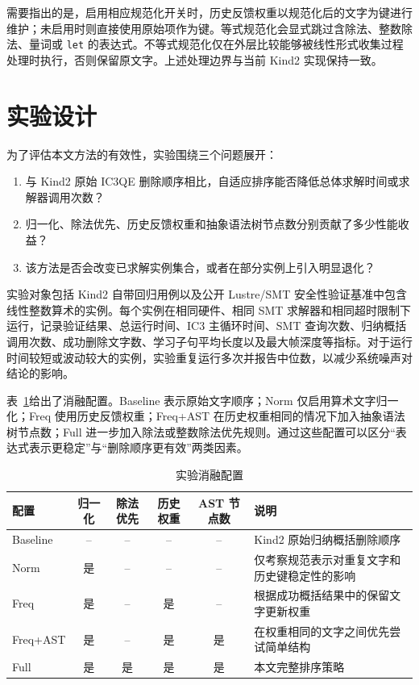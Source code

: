 \documentclass[11pt,a4paper]{article}
\begin{document}
需要指出的是，启用相应规范化开关时，历史反馈权重以规范化后的文字为键进行维护；未启用时则直接使用原始项作为键。等式规范化会显式跳过含除法、整数除法、量词或 \texttt{let} 的表达式。不等式规范化仅在外层比较能够被线性形式收集过程处理时执行，否则保留原文字。上述处理边界与当前 Kind2 实现保持一致。

\section{实验设计}

为了评估本文方法的有效性，实验围绕三个问题展开：
\begin{enumerate}
  \item 与 Kind2 原始 IC3QE 删除顺序相比，自适应排序能否降低总体求解时间或求解器调用次数？
  \item 归一化、除法优先、历史反馈权重和抽象语法树节点数分别贡献了多少性能收益？
  \item 该方法是否会改变已求解实例集合，或者在部分实例上引入明显退化？
\end{enumerate}

实验对象包括 Kind2 自带回归用例以及公开 Lustre/SMT 安全性验证基准中包含线性整数算术的实例。每个实例在相同硬件、相同 SMT 求解器和相同超时限制下运行，记录验证结果、总运行时间、IC3 主循环时间、SMT 查询次数、归纳概括调用次数、成功删除文字数、学习子句平均长度以及最大帧深度等指标。对于运行时间较短或波动较大的实例，实验重复运行多次并报告中位数，以减少系统噪声对结论的影响。

表~\ref{tab:ablation-configs}给出了消融配置。Baseline 表示原始文字顺序；Norm 仅启用算术文字归一化；Freq 使用历史反馈权重；Freq+AST 在历史权重相同的情况下加入抽象语法树节点数；Full 进一步加入除法或整数除法优先规则。通过这些配置可以区分“表达式表示更稳定”与“删除顺序更有效”两类因素。

\begin{table}[htbp]
  \centering
  \caption{实验消融配置}
  \label{tab:ablation-configs}
  \small
  \renewcommand{\arraystretch}{1.2}
  \begin{tabularx}{0.92\textwidth}{p{2.2cm} c c c c X}
    \toprule
    配置 & 归一化 & 除法优先 & 历史权重 & AST 节点数 & 说明 \\
    \midrule
    Baseline & -- & -- & -- & -- & Kind2 原始归纳概括删除顺序 \\
    Norm & 是 & -- & -- & -- & 仅考察规范表示对重复文字和历史键稳定性的影响 \\
    Freq & 是 & -- & 是 & -- & 根据成功概括结果中的保留文字更新权重 \\
    Freq+AST & 是 & -- & 是 & 是 & 在权重相同的文字之间优先尝试简单结构 \\
    Full & 是 & 是 & 是 & 是 & 本文完整排序策略 \\
    \bottomrule
  \end{tabularx}
\end{table}
\end{document}
